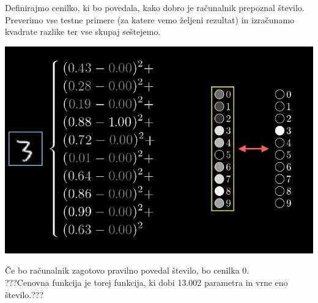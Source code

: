 \documentclass{beamer}
\begin{document}
\begin{frame}{}
Definirajmo cenilko, ki bo povedala, kako dobro je računalnik prepoznal število.\\
\smallskip
Preverimo vse testne primere (za katere vemo željeni rezultat) in izračunamo kvadrate razlike ter vse skupaj seštejemo.
\smallskip
\begin{center}
\includegraphics[scale = 0.35]{photo/2foto3} \\
\end{center}
\smallskip
Če bo računalnik zagotovo pravilno povedal število, bo cenilka 0. \\
\smallskip
???Cenovna funkcija je torej funkcija, ki dobi 13.002 parametra in vrne eno število.???
\end{frame}
 
\end{document}
